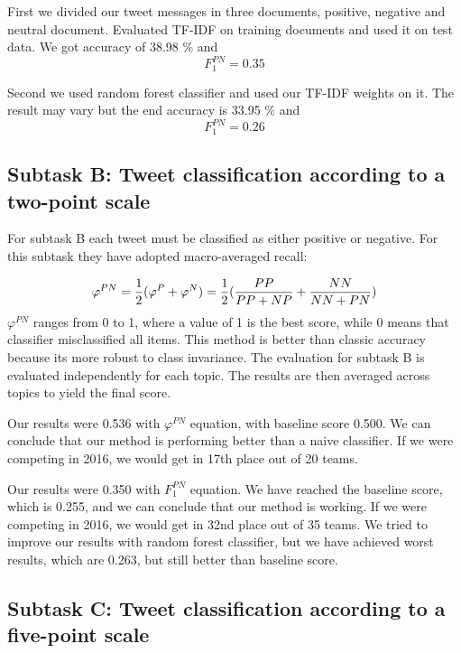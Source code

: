 \documentclass[runningheads,a4paper]{llncs}
\begin{document}
First we divided our tweet messages in three documents, positive, negative and neutral document. Evaluated TF-IDF on training documents and used it on test data. We got accuracy of 38.98 \% and
\begin{equation}
F^{PN}_1 = 0.35
\end{equation}

Second we used random forest classifier and used our TF-IDF weights on it. The result may vary but the end accuracy is 33.95 \% and
\begin{equation}
F^{PN}_1 = 0.26
\end{equation}

\subsection{Subtask B: Tweet classification according to a two-point scale}
For subtask B each tweet must be classified as either positive or negative. For this subtask they have adopted macro-averaged recall: 

\begin{equation}
\varphi^{PN} = \frac{1}{2}(\varphi^P + \varphi^N) \\
= \frac{1}{2}(\frac{PP}{PP + NP} + \frac{NN}{NN + PN})
\end{equation}
$\varphi^{PN}$ ranges from 0 to 1, where a value of 1 is the best score, while 0 means that classifier misclassified all items. This method is better than classic accuracy because its more robust to class invariance. The evaluation for subtask B is evaluated independently for each topic. The results are then averaged across topics to yield the final score.

Our results were 0.536 with $\varphi^{PN}$ equation, with baseline score 0.500. We can conclude that our method is performing better than a naive classifier. If we were competing in 2016, we would get in 17th place out of 20 teams.

Our results were 0.350 with $F^{PN}_1$ equation. We have reached the baseline score, which is 0.255, and we can conclude that our method is working. If we were competing in 2016, we would get in 32nd place out of 35 teams. We tried to improve our results with random forest classifier, but we have achieved worst results, which are 0.263, but still better than baseline score. 

\subsection{Subtask C: Tweet classification according to a five-point scale}
\end{document}
